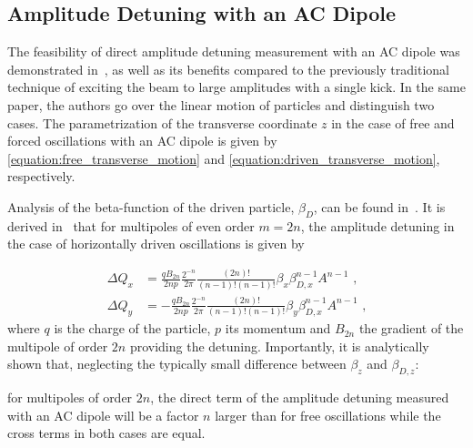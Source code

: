\subsection*{Amplitude Detuning with an AC Dipole}

The feasibility of direct amplitude detuning measurement with an AC dipole was demonstrated in~\cite{PRAB:White:Direct_Amplitude_Detuning_AC_Dipole}, as well as its benefits compared to the previously traditional technique of exciting the beam to large amplitudes with a single kick.
In the same paper, the authors go over the linear motion of particles and distinguish two cases.
The parametrization of the transverse coordinate \(z\) in the case of free and forced oscillations with an AC dipole is given by \cref{equation:free_transverse_motion} and \cref{equation:driven_transverse_motion}, respectively.

Analysis of the \gls{beta-function} of the driven particle, \(\beta_D\), can be found in~\cite{PHD:Miyamoto,PRAB:Miyamoto:Parametrization_Driven_Betatron_Oscillation,PRAB:White:Direct_Amplitude_Detuning_AC_Dipole}.
It is derived in~\cite{PRAB:White:Direct_Amplitude_Detuning_AC_Dipole} that for multipoles of even order \(m = 2n\), the amplitude detuning in the case of horizontally driven oscillations is given by

\begin{equation}
    \begin{aligned}
        \Delta Q_x &= \frac{q B_{2n}}{2np} \frac{2^{-n}}{2 \pi} \frac{(2n)!}{(n-1)! (n-1)!} \beta_x \beta_{D,x}^{n-1} A^{n-1} \text{ ,} \\
        \Delta Q_y &= -\frac{q B_{2n}}{2np} \frac{2^{-n}}{2 \pi} \frac{(2n)!}{(n-1)! (n-1)!} \beta_y \beta_{D,x}^{n-1} A^{n-1} \text{ ,}
    \end{aligned}
    \label{eqn:transverse_amp_det}
\end{equation}
where \(q\) is the charge of the particle, \(p\) its momentum and \(B_{2n}\) the gradient of the multipole of order \(2n\) providing the detuning.
Importantly, it is analytically shown that, neglecting the typically small difference between \(\beta_z\) and \(\beta_{D,z}\):

\begin{quoteblock}
    for multipoles of order \(2n\), the direct term of the amplitude detuning measured with an AC dipole will be a factor \(n\) larger than for free oscillations while the cross terms in both cases are equal.
\end{quoteblock}

